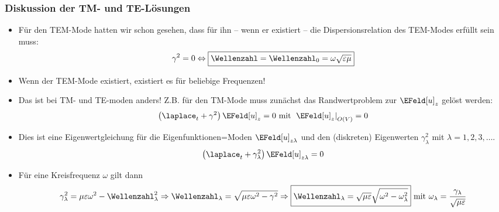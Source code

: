 \begin{frame}
  \frametitle{Diskussion der TM- und TE-Lösungen}
  \begin{itemize}[<+->]
  \item Für den \alert{TEM-Mode} hatten wir schon gesehen, dass für ihn -- wenn er existiert -- die \alert{Dispersionsrelation des TEM-Modes} erfüllt sein muss:
    \begin{equation*}
      \gamma^2=0 \Leftrightarrow \boxed{\Wellenzahl=\Wellenzahl_0=\omega\sqrt{\varepsilon\mu}}
    \end{equation*}
  \item Wenn der TEM-Mode existiert, existiert es für beliebige Frequenzen!
  \item Das ist bei TM- und TE-moden anders! Z.B. für den TM-Mode muss zunächst das Randwertproblem zur \(\EFeld[u]_z\) gelöst werden:
    \begin{equation*}
      \left(\laplace_t + \gamma^2\right) \EFeld[u]_z =  0 \text{ mit } \left. \EFeld[u]_z\right|_{O(V)} = 0
    \end{equation*}
  \item Dies ist eine \alert{Eigenwertgleichung} für die \alert{Eigenfunktionen=Moden} \(\EFeld[u]_{z\lambda}\) und den (diskreten) \alert{Eigenwerten} \(\gamma^2_\lambda\) mit \(\lambda = 1,2,3,\ldots\).
   \begin{equation*}
      \left(\laplace_t + \gamma_\lambda^2\right) \EFeld[u]_{z\lambda} =  0
    \end{equation*}
  \item Für eine Kreisfrequenz \(\omega\) gilt dann
    \begin{equation*}
      \gamma_\lambda^2 = \mu\varepsilon\omega^2-\Wellenzahl_\lambda^2 \Rightarrow \Wellenzahl_\lambda=\sqrt{\mu\varepsilon\omega^2-\gamma^2} \Rightarrow  \boxed{\Wellenzahl_\lambda=\sqrt{\mu\varepsilon}\sqrt{\omega^2-\omega_\lambda^2}} \text{ mit } \omega_\lambda=\frac{\gamma_\lambda}{\sqrt{\mu\varepsilon}} 
      \end{equation*}
 \end{itemize}
\end{frame}

